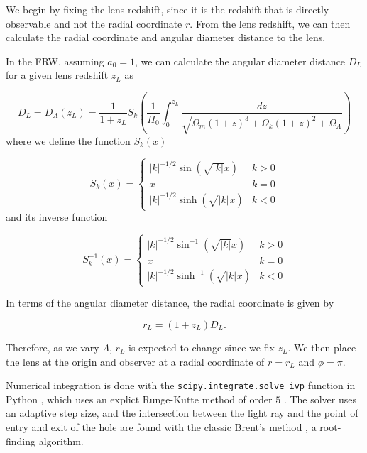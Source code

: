 We begin by fixing the lens redshift, since it is the redshift that is directly observable and not the radial coordinate $r$. From the lens redshift, we can then calculate the radial coordinate and angular diameter distance to the lens. 

In the FRW, assuming $a_0 = 1$, we can calculate the angular diameter distance $D_L$ for a given lens redshift $z_L$ as \citep{hogg1999distance}

\begin{equation}
  D_L = D_A(z_L) = \frac{1}{1+z_L} S_k\left ( \frac{1}{H_0}\int_0^{z_L} \frac{dz}{\sqrt{\Omega_m(1+z)^3 + \Omega_k (1+z)^2 + \Omega_{\Lambda}}}  \right )
  \label{eq:angular-diameter-distance-redshit-z}
\end{equation}
where we define the function $S_k(x)$

\begin{equation}
  S_k(x) = 
  \begin{cases}
    \mathopen| k \mathclose|^{-1/2} \sin(\sqrt{\mathopen| k \mathclose|}x) & k > 0\\
    x & k = 0\\
    \mathopen| k \mathclose|^{-1/2} \sinh(\sqrt{\mathopen| k \mathclose|}x) & k < 0
  \end{cases}
  \label{eq:sk}
\end{equation}
and its inverse function

\begin{equation}
  S_k^{-1}(x) = 
  \begin{cases}
    \mathopen| k \mathclose|^{-1/2} \sin^{-1}(\sqrt{\mathopen| k \mathclose|}x) & k > 0\\
    x & k = 0 \\
    \mathopen| k \mathclose|^{-1/2} \sinh^{-1}(\sqrt{\mathopen| k \mathclose|}x) & k < 0
  \end{cases}
  \label{eq:sk-inverse}
\end{equation}

In terms of the angular diameter distance, the radial coordinate is given by 

\begin{equation}
  r_L = (1+z_L)D_L.
\end{equation}

Therefore, as we vary $\Lambda$, $r_L$ is expected to change since we fix $z_L$. We then place the lens at the origin and observer at a radial coordinate of $r = r_L$ and $\phi = \pi$. 

Numerical integration is done with the \texttt{scipy.integrate.solve\_ivp} function in Python \citep{jones2014scipy}, which uses an explict Runge-Kutte method of order $5$ \citep{dormand1980family}. The solver uses an adaptive step size, and the intersection between the light ray and the point of entry and exit of the hole are found with the classic Brent's method \citep{brent2013algorithms}, a root-finding algorithm. 

